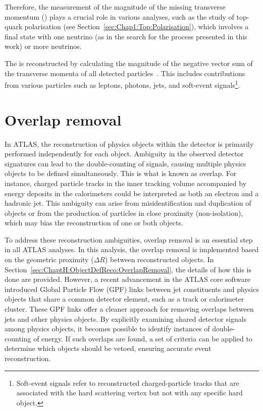 Therefore, the measurement of the magnitude of the missing transverse momentum (\MET) 
plays a crucial role in various analyses, such as the 
study of top-quark polarisation (see Section~\ref{sec:Chap1:Top:Polarisation}), which involves a 
final state with one neutrino (as in the search for the \tHq process presented in this work) or more neutrinos. 

The \MET is reconstructed by calculating the magnitude of the negative vector sum 
of the transverse momenta of all detected particles~\cite{ATLAS:2018txj, ATLAS:2018ghb}. 
This includes contributions from various particles such as leptons, photons, jets, and soft-event 
signals\footnote{Soft-event signals refer to reconstructed charged-particle tracks that 
are associated with the hard scattering vertex but not with any specific hard object.}.



\section{Overlap removal}
\label{sec:Chap3:Reco:OverlapRemoval}
In ATLAS, the reconstruction of physics objects within the detector is primarily 
performed independently for each object. 
Ambiguity in the observed detector signatures can lead to the double-counting 
of signals, causing multiple physics objects to be defined simultaneously. This
is what is known as overlap. 
For instance, charged particle tracks in the inner tracking volume accompanied by 
energy deposits in the calorimeters could be interpreted as both an electron and a hadronic jet.
This ambiguity can arise from misidentification and duplication of objects or from 
the production of particles in close proximity (non-isolation), which may bias the 
reconstruction of one or both objects.

To address these reconstruction ambiguities, overlap removal is an essential step in 
all ATLAS analyses. In this analysis, the overlap removal is 
implemented based on the geometric proximity ($\Delta R$) between reconstructed 
objects. In Section~\ref{sec:ChaptH:ObjectDefReco:OverlapRemoval}, the
details of how this is done are provided.
 However, a recent advancement in the ATLAS core software introduced 
Global Particle Flow (GPF) links between jet constituents and physics objects that 
share a common detector element, such as a track or calorimeter cluster. These GPF links 
offer a cleaner approach for removing overlaps between jets and other physics objects. 
By explicitly examining shared detector signals among physics objects, it becomes possible to 
identify instances of double-counting of energy. If such overlaps are found, a set of criteria can 
be applied to determine which objects should be vetoed, ensuring accurate event reconstruction.










\begin{comment}
asdf
%
\end{comment}
